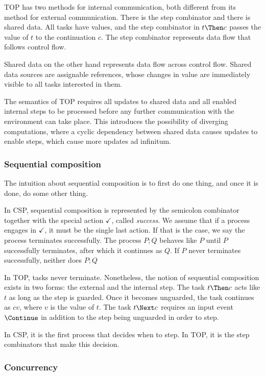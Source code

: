 TOP has two methods for internal communication, both different from its method for external communication.
There is the step combinator and there is shared data.
All tasks have values, and the step combinator in $t \Then c$ passes the value of $t$ to the continuation $c$.
The step combinator represents data flow that follows control flow.

Shared data on the other hand represents data flow across control flow.
Shared data sources are assignable references, whose changes in value are immediately visible to all tasks interested in them.

The semantics of TOP requires all updates to shared data and all enabled internal steps to be processed before any further communication with the environment can take place.
This introduces the possibility of diverging computations, where a cyclic dependency between shared data causes updates to enable steps, which cause more updates ad infinitum.


\subsubsection*{Sequential composition}

The intuition about sequential composition is to first do one thing, and once it is done, do some other thing.

In CSP, sequential composition is represented by the semicolon combinator together with the special action $\checkmark$, called \emph{success}.
We assume that if a process engages in $\checkmark$, it must be the single last action.
If that is the case, we say the process terminates successfully.
The process $P;Q$ behaves like $P$ until $P$ successfully terminates, after which it continues as $Q$.
If $P$ never terminates successfully, neither does $P;Q$

In TOP, tasks never terminate.
Nonetheless, the notion of sequential composition exists in two forms: the external and the internal step.
The task $t \Then c$ acts like $t$ as long as the step is guarded.
Once it becomes unguarded, the task continues as $cv$, where $v$ is the value of $t$.
The task $t \Next c$ requires an input event $\Continue$ in addition to the step being unguarded in order to step.

In CSP, it is the first process that decides when to step.
In TOP, it is the step combinators that make this decision.


\subsubsection*{Concurrency}

